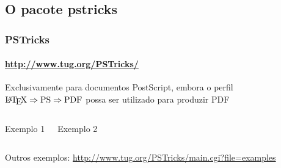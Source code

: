\documentclass[handout,10pt]{beamer}
\begin{document}
\subsection{O pacote pstricks}
\begin{frame}
	\frametitle{PSTricks}
	\framesubtitle{\href{http://www.tug.org/PSTricks/}{http://www.tug.org/PSTricks/}}
	
	\begin{center}
		Exclusivamente para documentos PostScript, embora o perfil $\text{\LaTeX} \Rightarrow \text{PS} \Rightarrow \text{PDF}$ possa ser utilizado para produzir PDF
	\end{center}
	
	\begin{columns}
		\begin{block}{Exemplo 1}
			\rule[-0.5\alturaB+0.5\alturaA]{0pt}{\alturaB}\usebox{\exemploA}
		\end{block}
		
		\begin{block}{Exemplo 2}
			\usebox{\exemploB}
		\end{block}
	\end{columns}

	\vfill

	\begin{center}
		\footnotesize
		Outros exemplos: \href{http://www.tug.org/PSTricks/main.cgi?file=examples}{http://www.tug.org/PSTricks/main.cgi?file=examples}
	\end{center}
	
\end{frame}
\end{document}
